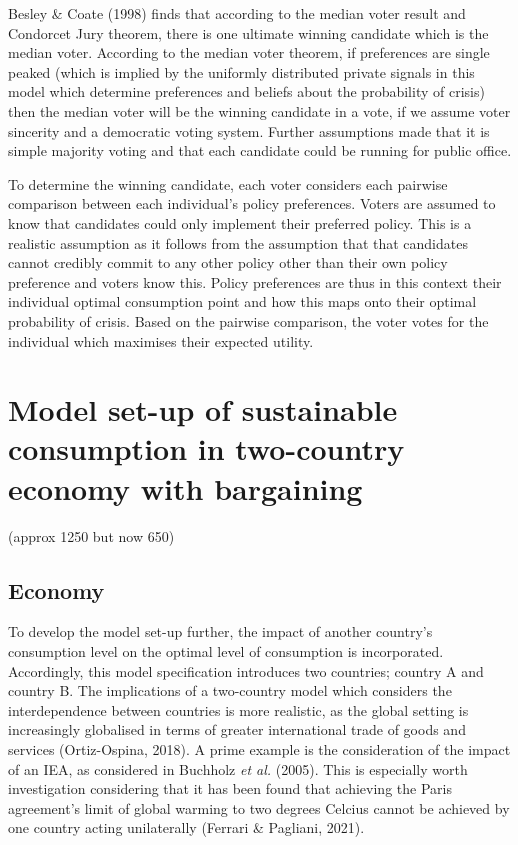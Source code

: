 \documentclass[11pt,preprint, authoryear]{elsarticle}
\numberwithin{equation}{section}
\numberwithin{figure}{section}
\numberwithin{table}{section}
\begin{document}
Besley \& Coate (1998) finds that according to the median voter result
and Condorcet Jury theorem, there is one ultimate winning candidate
which is the median voter. According to the median voter theorem, if
preferences are single peaked (which is implied by the uniformly
distributed private signals in this model which determine preferences
and beliefs about the probability of crisis) then the median voter will
be the winning candidate in a vote, if we assume voter sincerity and a
democratic voting system. Further assumptions made that it is simple
majority voting and that each candidate could be running for public
office.

To determine the winning candidate, each voter considers each pairwise
comparison between each individual's policy preferences. Voters are
assumed to know that candidates could only implement their preferred
policy. This is a realistic assumption as it follows from the assumption
that that candidates cannot credibly commit to any other policy other
than their own policy preference and voters know this. Policy
preferences are thus in this context their individual optimal
consumption point and how this maps onto their optimal probability of
crisis. Based on the pairwise comparison, the voter votes for the
individual which maximises their expected utility.

\hypertarget{model-set-up-of-sustainable-consumption-in-two-country-economy-with-bargaining}{%
\section{Model set-up of sustainable consumption in two-country economy
with
bargaining}\label{model-set-up-of-sustainable-consumption-in-two-country-economy-with-bargaining}}

(approx 1250 but now 650)

\hypertarget{economy-1}{%
\subsection*{Economy}\label{economy-1}}

To develop the model set-up further, the impact of another country's
consumption level on the optimal level of consumption is incorporated.
Accordingly, this model specification introduces two countries; country
A and country B. The implications of a two-country model which considers
the interdependence between countries is more realistic, as the global
setting is increasingly globalised in terms of greater international
trade of goods and services (Ortiz-Ospina, 2018). A prime example is the
consideration of the impact of an IEA, as considered in Buchholz
\emph{et al.} (2005). This is especially worth investigation considering
that it has been found that achieving the Paris agreement's limit of
global warming to two degrees Celcius cannot be achieved by one country
acting unilaterally (Ferrari \& Pagliani, 2021).
\end{document}
